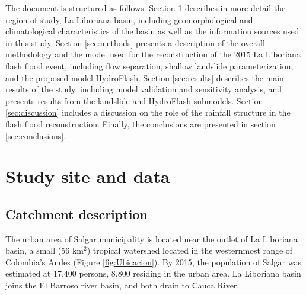 \documentclass[hess, manuscript]{copernicus}
\begin{document}
The document is structured as follows. Section \ref{sec:data} describes in more detail the region of study, La Liboriana basin, including geomorphological and climatological characteristics of the basin as well as the information sources used in this study. Section \ref{sec:methods} presents a description of the overall methodology and the model used for the reconstruction of the 2015 La Liboriana flash flood event, including flow separation, shallow landslide parameterization, and the proposed model HydroFlash. Section \ref{sec:results} describes the main results of the study, including model validation and sensitivity analysis, and presents results from the landslide and HydroFlash submodels. Section \ref{sec:discussion} includes a discussion on the role of the rainfall structure in the flash flood reconstruction.  Finally, the conclusions are presented in section \ref{sec:conclusions}.


\section{Study site and data}
\label{sec:data}

\subsection{Catchment description}

The urban area of Salgar municipality is located near the outlet of La Liboriana basin, a small (56 km$^2$) tropical watershed located in the westernmost range of Colombia's Andes (Figure \ref{fig:Ubicacion}). By 2015, the population of Salgar was estimated at 17,400 persons, 8,800 residing in the urban area. La Liboriana basin joins the El Barroso river basin, and both drain to Cauca River. \\
\end{document}
